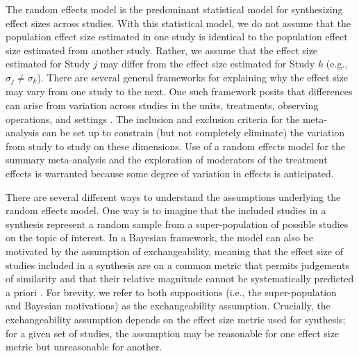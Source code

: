 \documentclass[
]{book}
\begin{document}
The random effects model is the predominant statistical model for synthesizing effect sizes across studies. With this statistical model, we do not assume that the population effect size estimated in one study is identical to the population effect size estimated from another study. Rather, we assume that the effect size estimated for Study \(j\) may differ from the effect size estimated for Study \(k\) (e.g., \(\sigma_j \ne \sigma_k\)). There are several general frameworks for explaining why the effect size may vary from one study to the next. One such framework posits that differences can arise from variation across studies in the units, treatments, observing operations, and settings \citep[UTOS;][]{Becker_1996}. The inclusion and exclusion criteria for the meta-analysis can be set up to constrain (but not completely eliminate) the variation from study to study on these dimensions. Use of a random effects model for the summary meta-analysis and the exploration of moderators of the treatment effects is warranted because some degree of variation in effects is anticipated.

There are several different ways to understand the assumptions underlying the random effects model. One way is to imagine that the included studies in a synthesis represent a random sample from a super-population of possible studies on the topic of interest. In a Bayesian framework, the model can also be motivated by the assumption of exchangeability, meaning that the effect size of studies included in a synthesis are on a common metric that permits judgements of similarity and that their relative magnitude cannot be systematically predicted a priori \citep{higgins2009reevaluation}. For brevity, we refer to both suppositions (i.e., the super-population and Bayesian motivations) as the exchangeability assumption. Crucially, the exchangeability assumption depends on the effect size metric used for synthesis; for a given set of studies, the assumption may be reasonable for one effect size metric but unreasonable for another.
\end{document}

